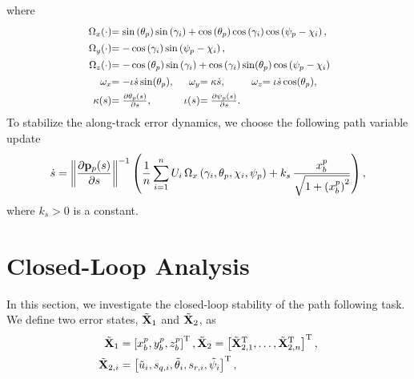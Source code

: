 where
\begin{subequations}
    \begin{align}
        \scale[0.90]{\Omega_x(\cdot)} & \mathrlap{\scale[0.90]{= \sin\left(\theta_p\right)\sin\left(\gamma_i\right) + \cos\left(\theta_p\right)\cos\left(\gamma_i\right)\cos\left(\psi_p-\chi_i\right),}} \\
        \scale[0.90]{\Omega_y(\cdot)} & \mathrlap{\scale[0.90]{= -\cos\left(\gamma_i\right)\sin\left(\psi_p - \chi_i\right),}} \\
        \scale[0.90]{\Omega_z(\cdot)} & \mathrlap{\scale[0.90]{=-\cos\left(\theta_p\right)\sin\left(\gamma_i\right) + \cos\left(\gamma_i\right)\sin(\theta_p)\cos\left(\psi_p-\chi_i\right)}} \\
        \scale[0.90]{\omega_x} & \scale[0.90]{= -\iota\dot{s}\sin(\theta_p),} &
        \scale[0.90]{\omega_y} & \scale[0.90]{= \kappa\dot{s},} &
        \scale[0.90]{\omega_z} & \scale[0.90]{= \iota\dot{s}\cos(\theta_p),} \\
        \scale[0.90]{\kappa(s)} & \scale[0.90]{= \frac{\partial \theta_p(s)}{\partial s},} &
        \scale[0.90]{\iota(s)} & \scale[0.90]{= \frac{\partial \psi_p(s)}{\partial s}.}
    \end{align}
\end{subequations}
To stabilize the along-track error dynamics, we choose the following path variable update 
\begin{equation}
    \dot{s} = \left\|\frac{\partial \mathbf{p}_p(s)}{\partial s}\right\|^{-1} \left( \frac{1}{n}\sum_{i=1}^n U_i\,\Omega_x\left(\gamma_i, \theta_p, \chi_i, \psi_p\right) + k_{s}\,\frac{x_b^p}{\sqrt{1+\left(x_b^p\right)^2}}\right),
    \label{eq:nsb_5dof_path_update}
\end{equation}
where $k_{s} > 0$ is a constant.

\section{Closed-Loop Analysis}
\label{sec:nsb_5dof_path_stability}
In this section, we investigate the closed-loop stability of the path following task.
We define two error states, $\tilde{\mathbf{X}}_1$ and $\tilde{\mathbf{X}}_2$, as
\begin{align}
    \tilde{\mathbf{X}}_1 &= \left[x_b^p, y_b^p, z_b^p\right]^{\mathrm{T}}, 
    \tilde{\mathbf{X}}_2 = \left[\tilde{\mathbf{X}}_{2,1}^{\mathrm{T}}, \ldots, \tilde{\mathbf{X}}_{2,n}^{\mathrm{T}}\right]^{\mathrm{T}}, \label{eq:nsb_5dof_error_states} \\
    \tilde{\mathbf{X}}_{2,i} &= \left[\tilde{u}_i, s_{q,i}, \tilde{\theta}_i, s_{r,i}, \tilde{\psi}_i\right]^{\mathrm{T}},
\end{align}

